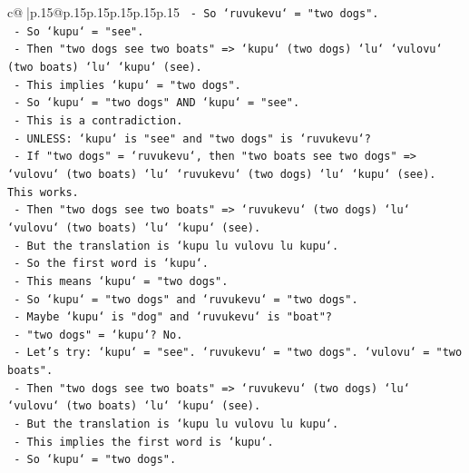 \documentclass{article}
\begin{document}
{\begin{supertabular}{c@{$\;$}|p{.15\linewidth}@{}p{.15\linewidth}p{.15\linewidth}p{.15\linewidth}p{.15\linewidth}p{.15\linewidth}}
{{{\texttt{                       {-} So `ruvukevu` = "two dogs".} \\
\texttt{                       {-} So `kupu` = "see".} \\
\texttt{                       {-} Then "two dogs see two boats" => `kupu` (two dogs) `lu` `vulovu` (two boats) `lu` `kupu` (see).} \\
\texttt{                       {-} This implies `kupu` = "two dogs".} \\
\texttt{                       {-} So `kupu` = "two dogs" AND `kupu` = "see".} \\
\texttt{                       {-} This is a contradiction.} \\
\texttt{                       {-} UNLESS: `kupu` is "see" and "two dogs" is `ruvukevu`?} \\
\texttt{                       {-} If "two dogs" = `ruvukevu`, then "two boats see two dogs" => `vulovu` (two boats) `lu` `ruvukevu` (two dogs) `lu` `kupu` (see). This works.} \\
\texttt{                       {-} Then "two dogs see two boats" => `ruvukevu` (two dogs) `lu` `vulovu` (two boats) `lu` `kupu` (see).} \\
\texttt{                       {-} But the translation is `kupu lu vulovu lu kupu`.} \\
\texttt{                       {-} So the first word is `kupu`.} \\
\texttt{                       {-} This means `kupu` = "two dogs".} \\
\texttt{                       {-} So `kupu` = "two dogs" and `ruvukevu` = "two dogs".} \\
\texttt{                       {-} Maybe `kupu` is "dog" and `ruvukevu` is "boat"?} \\
\texttt{                       {-} "two dogs" = `kupu`? No.} \\
\texttt{                       {-} Let's try: `kupu` = "see". `ruvukevu` = "two dogs". `vulovu` = "two boats".} \\
\texttt{                       {-} Then "two dogs see two boats" => `ruvukevu` (two dogs) `lu` `vulovu` (two boats) `lu` `kupu` (see).} \\
\texttt{                       {-} But the translation is `kupu lu vulovu lu kupu`.} \\
\texttt{                       {-} This implies the first word is `kupu`.} \\
\texttt{                       {-} So `kupu` = "two dogs".} \\
}}}
\end{supertabular}}
\end{document}
